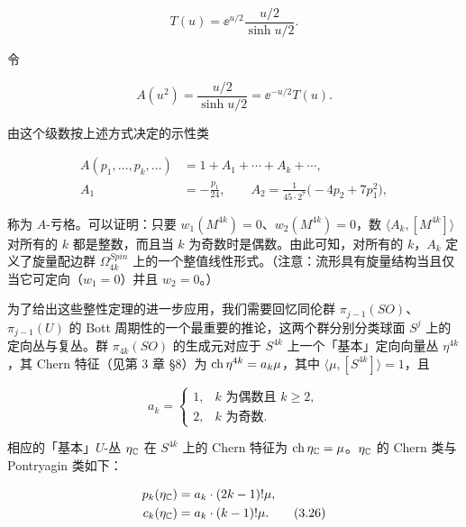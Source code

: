 \[ T(u)=\ee^{u/2}\frac{u/2}{\sinh u/2}. \]

令

\begin{equation}
A(u^2)=\frac{u/2}{\sinh u/2}=\ee^{-u/2}T(u). \tag{3.24}
\end{equation}

由这个级数按上述方式决定的示性类

\begin{align}
A(p_1,\dots,p_k,\dots) &= 1+A_1+\cdots+A_k+\cdots, \nonumber\\
A_1 &= -\frac{p_1}{24},\qquad A_2=\frac{1}{45\cdot 2^7}\bigl(-4p_2+7p_1^2\bigr), \tag{3.25}
\end{align}

称为 $A$-亏格。可以证明：只要 $w_1(M^{4k})=0$、$w_2(M^{4k})=0$，数 $\langle A_k,[M^{4k}]\rangle$ 对所有的 $k$ 都是整数，而且当 $k$ 为奇数时是偶数。由此可知，对所有的 $k$，$A_k$ 定义了旋量配边群 $\Omega_{4k}^{Spin}$ 上的一个整值线性形式。（注意：流形具有旋量结构当且仅当它可定向（$w_1=0$）并且 $w_2=0$。）


为了给出这些整性定理的进一步应用，我们需要回忆同伦群 $\pi_{j-1}(SO)$、$\pi_{j-1}(U)$ 的 Bott 周期性的一个最重要的推论，这两个群分别分类球面 $S^j$ 上的定向丛与复丛。群 $\pi_{4k}(SO)$ 的生成元对应于 $S^{4k}$ 上一个「基本」定向向量丛 $\eta^{4k}$，其 Chern 特征（见第 3 章 §8）为 $\operatorname{ch}\eta^{4k}=a_k\mu$，其中 $\langle\mu,[S^{4k}]\rangle=1$，且

\[ a_k=\begin{cases}1, & k\text{ 为偶数且 }k\ge 2,\\ 2, & k\text{ 为奇数}.\end{cases} \]

相应的「基本」$U$-丛 $\eta_{\mathbb{C}}$ 在 $S^{4k}$ 上的 Chern 特征为 $\operatorname{ch}\eta_{\mathbb{C}}=\mu$。$\eta_{\mathbb{C}}$ 的 Chern 类与 Pontryagin 类如下：

\begin{align}
p_k(\eta_{\mathbb{C}}) &= a_k\cdot(2k-1)!\mu, \nonumber\\
c_k(\eta_{\mathbb{C}}) &= a_k\cdot(k-1)!\mu. \tag{3.26}
\end{align}

